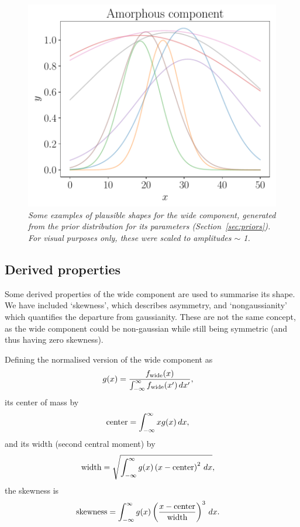 \documentclass[a4paper, 12pt]{article}
\newcommand{\x}{x}
\begin{document}
\begin{figure}[!ht]
\centering
\includegraphics[scale=0.7]{figures/wide_component.pdf}
\caption{\it Some examples of plausible shapes for the wide component,
generated from the prior distribution for its parameters
(Section~\ref{sec:priors}). For visual purposes only, these
were scaled to amplitudes $\sim$ 1. \label{fig:wide_component}}
\end{figure}

\subsection{Derived properties}
Some derived properties of the wide component are used to summarise its shape.
We have included `skewness', which describes asymmetry, and `nongaussianity'
which quantifies the departure from gaussianity. These are not the same
concept, as the wide component could be non-gaussian while still being symmetric
(and thus having zero skewness).

Defining the normalised version of the wide component as
\begin{align}
g(\x) &= \frac{f_{\rm wide}(\x)}
             {\int_{-\infty}^\infty f_{\rm wide}(\x') \, d\x'},
\end{align}
its center of mass by
\begin{align}
\textnormal{center} &= \int_{-\infty}^\infty x g(\x) \, d\x,
\end{align}
and its width (second central moment) by
\begin{align}
\textnormal{width} &= \sqrt{\int_{-\infty}^\infty
                            g(\x) \left(\x - \textnormal{center}\right)^2
                            \, d\x},
\end{align}
the skewness is
\begin{align}
\textnormal{skewness} &= \int_{-\infty}^\infty
                           g(\x) 
                           \left(
                             \frac{x - \textnormal{center}}{\textnormal{width}}
                           \right)^3
                         \, d\x.
\end{align}
\end{document}
